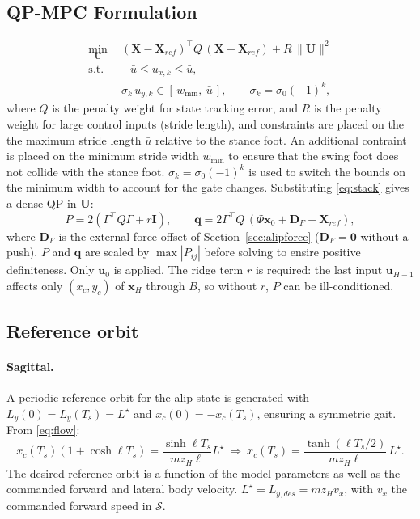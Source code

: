 \documentclass[11pt]{article}
\theoremstyle{remark}
\theoremstyle{definition}
\newcommand{\x}{\bm{x}}
\newcommand{\uu}{\bm{u}}
\newcommand{\bU}{\bm{U}}
\newcommand{\I}{\bm{I}}
\newcommand{\zero}{\bm{0}}
\begin{document}
\subsection{QP-MPC Formulation}
\begin{equation}
\begin{aligned}
  \min_{\bU}\ \ & (\bm X-\bm X_{ref})^\top Q\,(\bm X-\bm X_{ref})+R\,\|\bU\|^2\\
  \text{s.t.}\ \ & -\bar u\le u_{x,k}\le\bar u,\\
  & \sigma_k\,u_{y,k}\in[\,w_{\min},\ \bar u\,],\qquad \sigma_k=\sigma_0(-1)^k,
\end{aligned}
\label{eq:mpcqp}
\end{equation}
where $Q$ is the penalty weight for state tracking error, and $R$ is the penalty weight for large control inputs (stride length), 
and constraints are placed on the the maximum stride length $\bar u$ relative to the stance foot.
An additional contraint is placed on the minimum stride width $w_{\min}$ to ensure that the swing foot does not collide with the stance foot. 
$\sigma_k=\sigma_0(-1)^k$ is used to switch the bounds on the minimum width to account for the gate changes. 
Substituting \eqref{eq:stack} gives a dense QP in $\bU$:
\begin{equation}
  P=2(\Gamma^\top Q\Gamma+r\I),\qquad \bm q=2\Gamma^\top Q\,(\Phi\x_0+\bm D_F-\bm X_{ref}),
\end{equation}
where $\bm D_F$ is the external-force offset of Section~\ref{sec:alipforce} ($\bm D_F=\zero$ without a push).
$P$ and $\bm q$ are scaled by $\max|P_{ij}|$ before solving to ensire positive definiteness. Only $\uu_0$ is applied. The
ridge term $r$ is required: the last input $\uu_{H-1}$ affects only $(x_c,y_c)$ of $\x_H$ through $B$,
so without $r$, $P$ can be ill-conditioned.

\subsection{Reference orbit}\label{sec:orbit}
\paragraph{Sagittal.} A periodic reference orbit for the alip state is generated with $L_y(0)=L_y(T_s)=L^\star$ and
$x_c(0)=-x_c(T_s)$, ensuring a symmetric gait. From \eqref{eq:flow}:
\begin{equation}
  x_c(T_s)(1+\cosh\ell T_s)=\frac{\sinh\ell T_s}{m z_H\ell}L^\star
  \ \Rightarrow\
  x_c(T_s)=\frac{\tanh(\ell T_s/2)}{m z_H\ell}\,L^\star.
  \label{eq:xcorbit}
\end{equation}
The desired reference orbit is a function of the model parameters as well as the commanded forward and lateral body velocity.
 $L^\star=L_{y,des}=m z_H v_x$, with $v_x$ the commanded forward speed in $\mathcal S$.
\end{document}

